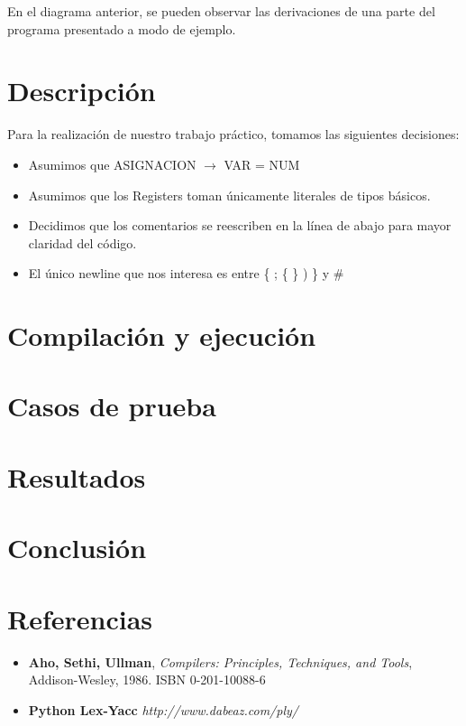 \documentclass[10pt,a4paper]{article}
\begin{document}
En el diagrama anterior, se pueden observar las derivaciones de una parte del programa presentado a modo de ejemplo.

\section{Descripción}

Para la realización de nuestro trabajo práctico, tomamos las siguientes decisiones:
\begin{itemize}
\item Asumimos que ASIGNACION $\rightarrow$ VAR = NUM 

\item Asumimos que los Registers toman únicamente literales de tipos básicos.

\item Decidimos que los comentarios se reescriben en la línea de abajo para mayor claridad del código.

\item El único newline que nos interesa es entre \{ ; \{ \} ) \} y \#
\end{itemize}


\section{Compilación y ejecución}

\section{Casos de prueba}

\section{Resultados}

\section{Conclusión}

\section{Referencias}
\begin{itemize}
\item \textbf{Aho, Sethi, Ullman}, \textit{Compilers: Principles, Techniques, and Tools}, Addison-Wesley, 1986. ISBN 0-201-10088-6

\item \textbf{Python Lex-Yacc} \textit{http://www.dabeaz.com/ply/}
\end{itemize}
\end{document}
